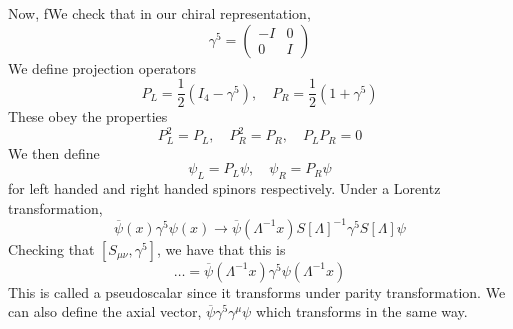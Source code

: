 Now, fWe check that in our chiral representation, 
\[
	\gamma ^ 5 = \begin{pmatrix}  - I & 0 \\ 0 & I  \end{pmatrix} 
\] We define projection operators 
\[
	P _ L = \frac{1}{2 } ( I _ 4 - \gamma ^ 5 ) , \quad P _ R = \frac{1}{2 } ( 1 + \gamma ^ 5 ) 
\] These obey the properties 
\[
 P_ L ^ 2 = P_L , \quad P _ R ^ 2 = P _ R , \quad P _ L P _ R = 0 
\] We then define 
\[
 \psi _ L = P_L \psi , \quad \psi _ R = P _ R \psi 
\] for left handed and right handed spinors respectively. 
Under a Lorentz transformation, 
\[
	\overline{ \psi } ( x) \gamma ^ 5 \psi ( x) \to \overline{ \psi } ( \Lambda ^{ - 1} x ) 
	S [ \Lambda ] ^{ - 1} \gamma ^ 5 S [ \Lambda ] \psi 
\] Checking that $ [ S_{ \mu\nu } , \gamma ^ 5 ] $, we have that 
this is 
\[
	\dots = \overline{ \psi } ( \Lambda ^{ -1 } x ) \gamma ^ 5 \psi ( \Lambda ^{ - 1} x ) 
\] This is called a pseudoscalar since it transforms under 
parity transformation. We can also define the axial vector, $ \overline{ \psi } \gamma ^ 5 \gamma ^ \mu 
\psi $ which transforms in the same way. 

